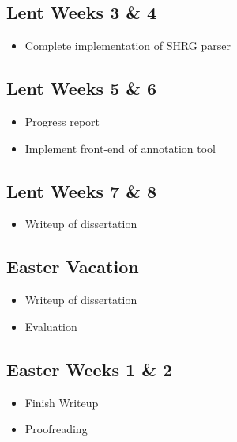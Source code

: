 \documentclass{article}
\begin{document}
\subsection*{Lent Weeks 3 \& 4}
\begin{itemize}
    \item Complete implementation of SHRG parser
\end{itemize}

\subsection*{Lent Weeks 5 \& 6}
\begin{itemize}
    \item Progress report
    \item Implement front-end of annotation tool
\end{itemize}

\subsection*{Lent Weeks 7 \& 8}
\begin{itemize}
    \item Writeup of dissertation
\end{itemize}

\subsection*{Easter Vacation}
\begin{itemize}
    \item Writeup of dissertation
    \item Evaluation
\end{itemize}

\subsection*{Easter Weeks 1 \& 2}
\begin{itemize}
    \item Finish Writeup
    \item Proofreading
\end{itemize}
\end{document}
